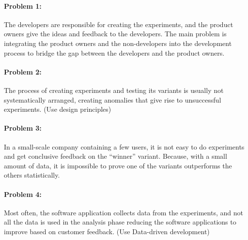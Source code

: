 \paragraph{Problem 1:} The developers are responsible for creating the experiments, and the product owners give the ideas and feedback to the developers.
The main problem is integrating the product owners and the non-developers into the development process to bridge the gap between the developers and the product owners.

\paragraph{Problem 2:} The process of creating experiments and testing its variants is usually not systematically arranged, creating anomalies that give rise to unsuccessful experiments. (Use design principles)

\paragraph{Problem 3:} In a small-scale company containing a few users, it is not easy to do experiments and get conclusive feedback on the ``winner'' variant. 
Because, with a small amount of data, it is impossible to prove one of the variants outperforms the others statistically.

\paragraph{Problem 4:} Most often, the software application collects data from the experiments, and not all the data is used in the analysis phase reducing the software applications to improve based on customer feedback. (Use Data-driven development)

